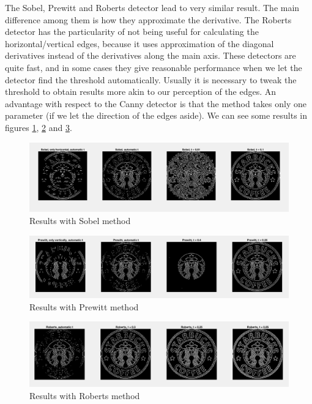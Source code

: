 The Sobel, Prewitt and Roberts detector lead to very similar result. The main difference among them
is how they approximate the derivative. The Roberts detector has the particularity of not being useful
for calculating the horizontal/vertical edges, because it uses approximation of the diagonal
derivatives instead of the derivatives along the main axis. These detectors are quite fast, and in
some cases they give reasonable performance when we let the detector find the threshold automatically.
Usually it is necessary to tweak the threshold to obtain results more akin to our perception of
the edges. An advantage with respect to the Canny detector is that the method takes only one parameter
(if we let the direction of the edges aside). We can see some results in figures \ref{fig:im1},
\ref{fig:im2} and \ref{fig:im3}.

\begin{figure}[!hbt]
  \includegraphics[width=\textwidth]{./img/ex1/im1.png}
  \caption{Results with Sobel method}
  \label{fig:im1}
\end{figure}

\begin{figure}[!hbt]
  \includegraphics[width=\textwidth]{./img/ex1/im2.png}
  \caption{Results with Prewitt method}
  \label{fig:im2}
\end{figure}

\begin{figure}[!hbt]
  \includegraphics[width=\textwidth]{./img/ex1/im3.png}
  \caption{Results with Roberts method}
  \label{fig:im3}
\end{figure}

